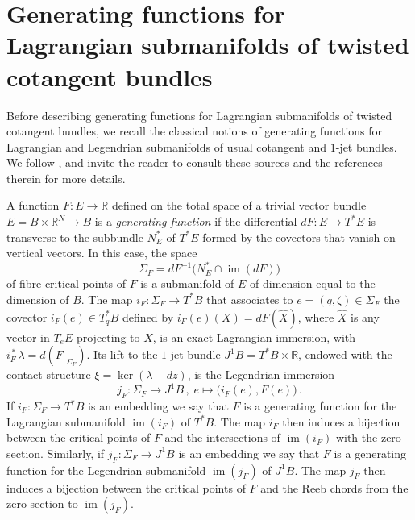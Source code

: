 \documentclass{amsart}
\DeclareMathOperator{\im}{im}
\theoremstyle{remark}
\begin{document}
\section{Generating functions for Lagrangian submanifolds of twisted cotangent bundles}\label{section: gf}

Before describing generating functions
for Lagrangian submanifolds of twisted cotangent bundles,
we recall the classical notions of generating functions
for Lagrangian and Legendrian submanifolds
of usual cotangent and $1$-jet bundles.
We follow \cite{Viterbo, Bhupal, San11},
and invite the reader to consult these sources
and the references therein for more details.

A function $F: E \rightarrow \mathbb{R}$
defined on the total space of a trivial vector bundle
$E = B \times \mathbb{R}^N \rightarrow B$
is a \emph{generating function}
if the differential $dF: E \rightarrow T^{\ast}E$
is transverse to the subbundle $N_E^{\ast}$ of $T^{\ast}E$
formed by the covectors that vanish on vertical vectors.
In this case, the space
$$
\Sigma_F = dF^{-1} \big( N_E^{\ast} \cap \im (dF) \big)
$$
of fibre critical points of $F$
is a submanifold of $E$
of dimension equal to the dimension of $B$.
The map $i_F: \Sigma_F \rightarrow T^{\ast}B$
that associates to $e = (q, \zeta) \in \Sigma_F$
the covector $i_F(e) \in T_q^{\ast}B$
defined by $i_F(e) (X) = dF (\hat{X})$,
where $\hat{X}$ is any vector in $T_eE$
projecting to $X$,
is an exact Lagrangian immersion,
with $i_F^{\,\ast} \, \lambda = d ( \left. F \right\lvert_{\Sigma_F} )$.
Its lift to the $1$-jet bundle $J^1B = T^{\ast}B \times \mathbb{R}$,
endowed with the contact structure $\xi = \ker (\lambda - dz)$,
is the Legendrian immersion
\[
j_F: \Sigma_F \rightarrow J^1B \,,\;
e \mapsto \big( i_F(e), F(e) \big) \,.
\]
If $i_F: \Sigma_F \rightarrow T^{\ast}B$ is an embedding
we say that $F$ is a generating function
for the Lagrangian submanifold $\im (i_F)$ of $T^{\ast}B$.
The map $i_F$ then induces a bijection
between the critical points of $F$
and the intersections of $\im (i_F)$ with the zero section.
Similarly, if $j_F: \Sigma_F \rightarrow J^1B$ is an embedding
we say that $F$ is a generating function
for the Legendrian submanifold $\im (j_F)$ of $J^1B$.
The map $j_F$ then induces a bijection
between the critical points of $F$
and the Reeb chords from the zero section to $\im (j_F)$.
\end{document}
